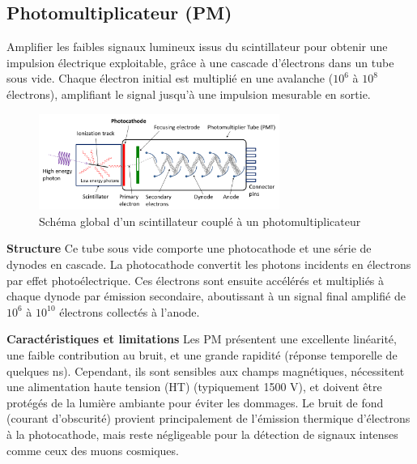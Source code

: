 \documentclass[a4paper,12pt,twoside]{article}
\begin{document}
\subsection{Photomultiplicateur (PM)}


\vspace{1em}
\begin{center}
\begin{tcolorbox}[colback=blue!5!white, colframe=blue!60!black, title=Principe du photomultiplicateur (PM)]
Amplifier les faibles signaux lumineux issus du scintillateur pour obtenir une impulsion électrique exploitable, grâce à une cascade d’électrons dans un tube sous vide. Chaque électron initial est multiplié en une avalanche ($10^6$ à $10^8$ électrons), amplifiant le signal jusqu’à une impulsion mesurable en sortie.

\end{tcolorbox}
\end{center}


\begin{figure}[H]
  \centering
  \includegraphics[width=0.7\textwidth]{Images/PhotoMultiplierTubeAndScintillator.png}
  \caption{Schéma global d’un scintillateur couplé à un photomultiplicateur}
  \label{fig:pm_scintillator}
\end{figure}

\textbf{Structure}
Ce tube sous vide comporte une photocathode et une série de dynodes en cascade. La photocathode convertit les photons incidents en électrons par effet photoélectrique. Ces électrons sont ensuite accélérés et multipliés à chaque dynode par émission secondaire, aboutissant à un signal final amplifié de $10^6$ à $10^{10}$ électrons collectés à l'anode.

\textbf{Caractéristiques et limitations}
Les PM présentent une excellente linéarité, une faible contribution au bruit, et une grande rapidité (réponse temporelle de quelques ns). Cependant, ils sont sensibles aux champs magnétiques, nécessitent une alimentation haute tension (HT) (typiquement 1500 V), et doivent être protégés de la lumière ambiante pour éviter les dommages. Le bruit de fond (courant d'obscurité) provient principalement de l'émission thermique d'électrons à la photocathode, mais reste négligeable pour la détection de signaux intenses comme ceux des muons cosmiques.
\end{document}
